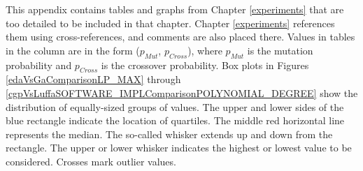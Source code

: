 %
%
%
%
%
%
This appendix contains tables and graphs from Chapter \ref{experiments} that
are too detailed to be included in that chapter.
Chapter \ref{experiments} references them using cross-references, and
comments are also placed there.
Values in tables in the  column are in the form ($p_{Mut}$, $p_{Cross}$),
where $p_{Mut}$ is the mutation probability and $p_{Cross}$ is the crossover probability.
Box plots in Figures \ref{edaVsGaComparisonLP_MAX} through \ref{cgpVsLuffaSOFTWARE_IMPLComparisonPOLYNOMIAL_DEGREE}
show the distribution of equally-sized groups of values.
The upper and lower sides of the blue rectangle indicate the location of quartiles. The middle red
horizontal line represents the median. The so-called whisker extends up and down from the rectangle.
The upper or lower whisker indicates the highest or lowest value to be considered.
Crosses mark outlier values.
\nopagebreak
